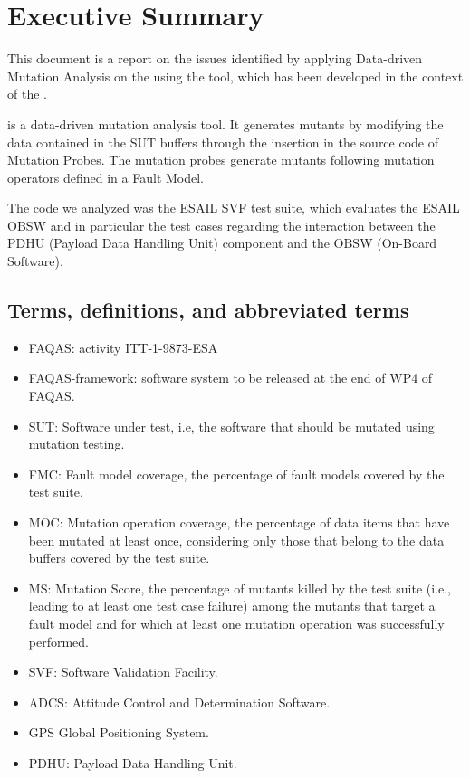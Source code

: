 
\chapter{Executive Summary}

This document is a report on the issues identified by applying Data-driven Mutation Analysis on the \case using the \DAMA tool, which has been developed in the context of the \FAQAS.

\DAMA is a data-driven mutation analysis tool. It generates mutants by modifying the data contained in the SUT buffers through the insertion in the source code of Mutation Probes. The mutation probes generate mutants following mutation operators defined in a Fault Model.

The code we analyzed was the ESAIL SVF test suite, which evaluates the ESAIL OBSW and in particular the test cases regarding the interaction between the PDHU (Payload Data Handling Unit) component and the OBSW (On-Board Software).


\section{Terms, definitions, and abbreviated terms}

\begin{itemize}
\item{FAQAS}: activity ITT-1-9873-ESA
\item{FAQAS-framework}: software system to be released at the end of WP4 of FAQAS.
\item{SUT}: Software under test, i.e, the software that should be mutated using mutation testing.
\item{FMC}: Fault model coverage, the percentage of fault models covered by the test suite.
\item{MOC}: Mutation operation coverage, the percentage of data items that have been mutated at least once, considering only those that belong to the data buffers covered by the test suite.
\item{MS}: Mutation Score, the percentage of mutants killed by the test suite (i.e., leading to at least one test case failure) among the mutants that target a fault model and for which at least one mutation operation was successfully performed.
\item{SVF}: Software Validation Facility.
\item{ADCS}: Attitude Control and Determination Software.
\item{GPS} Global Positioning System.
\item{PDHU}: Payload Data Handling Unit.

\end{itemize}

\clearpage
